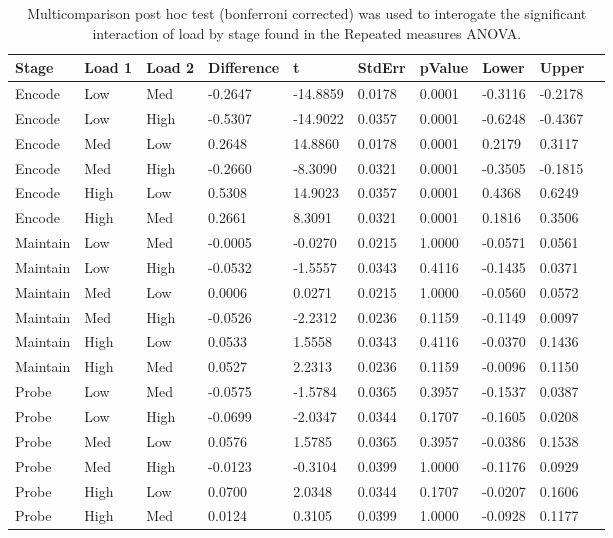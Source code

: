 \begin{table}
\centering
\begin{tabular}[0.2em]{@{}llllllllll@{}}\toprule
Stage & Load 1 & Load 2 & Difference & t & StdErr & pValue & Lower & Upper\\\toprule[0.2em]
Encode & Low & Med & -0.2647 & -14.8859 & 0.0178 & 0.0001 & -0.3116 & -0.2178 \\\midrule
Encode & Low & High & -0.5307 & -14.9022 & 0.0357 & 0.0001 & -0.6248 & -0.4367 \\\midrule
Encode & Med & Low & 0.2648 & 14.8860 & 0.0178 & 0.0001 & 0.2179 & 0.3117 \\\midrule
Encode & Med & High & -0.2660 & -8.3090 & 0.0321 & 0.0001 & -0.3505 & -0.1815 \\\midrule
Encode & High & Low & 0.5308 & 14.9023 & 0.0357 & 0.0001 & 0.4368 & 0.6249 \\\midrule
Encode & High & Med & 0.2661 & 8.3091 & 0.0321 & 0.0001 & 0.1816 & 0.3506 \\\midrule
Maintain & Low & Med & -0.0005 & -0.0270 & 0.0215 & 1.0000 & -0.0571 & 0.0561 \\\midrule
Maintain & Low & High & -0.0532 & -1.5557 & 0.0343 & 0.4116 & -0.1435 & 0.0371 \\\midrule
Maintain & Med & Low & 0.0006 & 0.0271 & 0.0215 & 1.0000 & -0.0560 & 0.0572 \\\midrule
Maintain & Med & High & -0.0526 & -2.2312 & 0.0236 & 0.1159 & -0.1149 & 0.0097 \\\midrule
Maintain & High & Low & 0.0533 & 1.5558 & 0.0343 & 0.4116 & -0.0370 & 0.1436 \\\midrule
Maintain & High & Med & 0.0527 & 2.2313 & 0.0236 & 0.1159 & -0.0096 & 0.1150 \\\midrule
Probe & Low & Med & -0.0575 & -1.5784 & 0.0365 & 0.3957 & -0.1537 & 0.0387 \\\midrule
Probe & Low & High & -0.0699 & -2.0347 & 0.0344 & 0.1707 & -0.1605 & 0.0208 \\\midrule
Probe & Med & Low & 0.0576 & 1.5785 & 0.0365 & 0.3957 & -0.0386 & 0.1538 \\\midrule
Probe & Med & High & -0.0123 & -0.3104 & 0.0399 & 1.0000 & -0.1176 & 0.0929 \\\midrule
Probe & High & Low & 0.0700 & 2.0348 & 0.0344 & 0.1707 & -0.0207 & 0.1606 \\\midrule
Probe & High & Med & 0.0124 & 0.3105 & 0.0399 & 1.0000 & -0.0928 & 0.1177 \\\bottomrule[0.2em]
\end{tabular}
\caption{Multicomparison post hoc test (bonferroni corrected) was used to interogate the significant interaction of load by stage found in the Repeated measures ANOVA.\label{tabel:tbl_RMABA1_PH_inter}}
\end{table}
